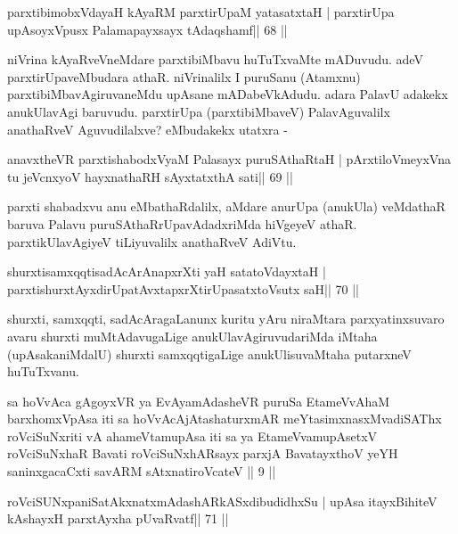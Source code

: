\begin{shl}
parxtibimobxVdayaH kAyaRM parxtirUpaM yatasatxtaH |
parxtirUpa upAsoyxV\s pusx Palamapayxsayx tAdaqshamf\hfill || 68 ||
\end{shl}

\begin{artha}
niVrina kAyaRveVneMdare parxtibiMbavu huTuTxvaMte mADuvudu. adeV parxtirUpaveMbudara athaR. niVrinalilx I puruSanu (Atamxnu) parxtibiMbavAgiruvaneMdu upAsane mADabeVkAdudu. adara PalavU adakekx anukUlavAgi baruvudu. parxtirUpa (parxtibiMbaveV) PalavAguvalilx anathaRveV Aguvudilalxve? eMbudakekx utatxra - 
\end{artha}

\begin{shl}
anavxtheVR parxtishabodxV\s yaM Palasayx puruSAthaRtaH |
pArxtiloVmeyxVna tu jeVcnxyoV hayxnathaRH sAyxtatxthA sati\hfill || 69 ||
\end{shl}

\begin{artha}
parxti shabadxvu anu eMbathaRdalilx, aMdare anurUpa (anukUla) veMdathaR  baruva Palavu puruSAthaRrUpavAdadxriMda hiVgeyeV athaR. parxtikUlavAgiyeV tiLiyuvalilx anathaRveV AdiVtu.
\end{artha}

\begin{shl}
shurxtisamxqqtisadAcArAnapxrXti yaH satatoVdayxtaH |
parxtishurxtAyxdirUpatAvxtapxrXtirUpasatxtoV\s sutx saH\hfill || 70 ||
\end{shl}

\begin{artha}
shurxti, samxqqti, sadAcAragaLanunx kuritu yAru niraMtara parxyatinxsuvaro avaru shurxti muMtAdavugaLige anukUlavAgiruvudariMda iMtaha (upAsakaniMdalU) shurxti samxqqtigaLige anukUlisuvaMtaha putarxneV huTuTxvanu.
\end{artha}


\begin{kandikeshl}
sa hoVvAca gAgoyxVR ya EvAyamAdasheVR puruSa EtameVvAhaM barxhomxVpAsa iti sa hoVvAcAjAtashaturxmAR meYtasimxnasxMvadiSAThx roVciSuNxriti vA ahameVtamupAsa iti sa ya EtameVvamupAsetxV roVciSuNxhaR Bavati roVciSuNxhARsayx parxjA BavatayxthoV yeYH saninxgacaCxti savARM sAtxnatiroVcateV || 9 ||
\end{kandikeshl}


\begin{shl}
roVciSUNxpaniSatAkxnatxmAdashARkASxdibudidhxSu |
upAsa itayxBihiteV kAshayxH parxtAyxha pUvaRvatf\hfill || 71 ||
\end{shl}

